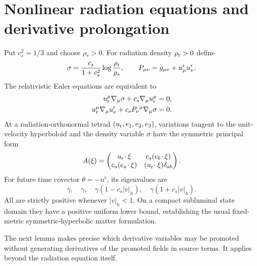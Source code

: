 \documentclass[10pt,a4paper]{article}
\begin{document}
\section{Nonlinear radiation equations and derivative prolongation}
Put $c_s^2=1/3$ and choose $\rho_*>0$. For radiation density $\rho_{\rm r}>0$ define
\begin{equation}\label{eq:sigma}
\sigma=\frac{c_s}{1+c_s^2}\log\frac{\rho_{\rm r}}{\rho_*},\qquad
P_{\mu\nu}=g_{\mu\nu}+u^{\rm r}_\mu u^{\rm r}_\nu.
\end{equation}
The relativistic Euler equations are equivalent to
\begin{align}\label{eq:euler}
u_{\rm r}^\mu\nabla_\mu\sigma+c_s\nabla_\mu u_{\rm r}^\mu&=0,\\
u_{\rm r}^\mu\nabla_\mu u^{\rm r}_\nu+c_sP_\nu{}^\mu\nabla_\mu\sigma&=0.
\end{align}
At a radiation-orthonormal tetrad $(u_{\rm r},e_1,e_2,e_3)$, variations tangent to the unit-velocity hyperboloid and the density variable $\sigma$ have the symmetric principal form
\begin{equation}\label{eq:radA}
A(\xi)=\begin{pmatrix}u_{\rm r}\!\cdot\xi&c_s(e_b\!\cdot\xi)\\
c_s(e_a\!\cdot\xi)&(u_{\rm r}\!\cdot\xi)\delta_{ab}\end{pmatrix}.
\end{equation}
For future time covector $\theta=-n^\flat$, its eigenvalues are
\begin{equation}\label{eq:rada0}
\gamma,\quad\gamma,\quad\gamma(1-c_s|v|_h),\quad\gamma(1+c_s|v|_h).
\end{equation}
All are strictly positive whenever $|v|_h<1$. On a compact subluminal state domain they have a positive uniform lower bound, establishing the usual fixed-metric symmetric-hyperbolic matter formulation.

The next lemma makes precise which derivative variables may be promoted without generating derivatives of the promoted fields in source terms. It applies beyond the radiation equation itself.
\end{document}
